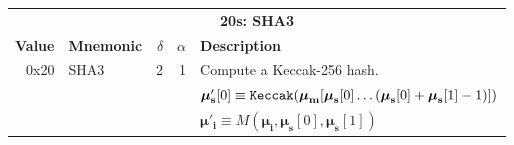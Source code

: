 \documentclass[9pt,oneside]{amsart}
\begin{document}
\begin{tabularx}{\textwidth}{rlrrX}
\toprule
\multicolumn{5}{c}{\textbf{20s: SHA3}} \vspace{5pt} \\
\textbf{Value} & \textbf{Mnemonic} & $\delta$ & $\alpha$ & \textbf{Description} \vspace{5pt} \\
0x20 & {\small SHA3} & 2 & 1 & Compute a Keccak-256 hash. \\
&&&& $\boldsymbol{\mu}'_\mathbf{s}[0] \equiv \mathtt{\tiny Keccak}(\boldsymbol{\mu}_\mathbf{m}[ \boldsymbol{\mu}_\mathbf{s}[0] \dots (\boldsymbol{\mu}_\mathbf{s}[0] + \boldsymbol{\mu}_\mathbf{s}[1] - 1) ])$ \\
&&&& $\boldsymbol{\mu}'_\mathbf{i} \equiv M(\boldsymbol{\mu}_\mathbf{i}, \boldsymbol{\mu}_\mathbf{s}[0], \boldsymbol{\mu}_\mathbf{s}[1])$ \\
\bottomrule
\end{tabularx}
\end{document}
